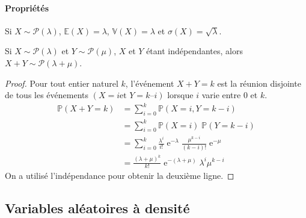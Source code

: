 \paragraph[Propriétés]{Propriétés}
\begin{theorem}
Si \(𝑋∼𝒫(𝜆)\), \(𝔼(𝑋)=𝜆\), \(𝕍(𝑋)=𝜆\) et \(σ(𝑋)=\sqrt{𝜆}\).
\end{theorem}
\begin{theorem}
Si \(𝑋∼𝒫(𝜆)\) et \(𝑌∼𝒫(𝜇)\), \(𝑋\) et \(𝑌\) étant indépendantes, alors
\(𝑋+𝑌∼𝒫(𝜆+𝜇)\).
\end{theorem}
\begin{proof}
Pour tout entier naturel \(𝑘\), l'événement \(𝑋+𝑌=𝑘\) est la réunion disjointe de tous les événements \((𝑋=𝑖\text{
et }𝑌=𝑘–𝑖)\) lorsque \(𝑖\) varie entre \(0\) et \(𝑘\).
\begin{align*}
ℙ(𝑋+𝑌=𝑘)&{}=∑_{𝑖=0}^{𝑘}ℙ(𝑋=𝑖,𝑌=𝑘-𝑖)
\\&{}=
∑_{𝑖=0}^{𝑘}ℙ(𝑋=𝑖)\;ℙ(𝑌=𝑘-𝑖)
\\&{}=
∑_{𝑖=0}^{𝑘}\frac{λ^{𝑖}}{𝑖!}\operatorname{e}^{-λ}\frac{μ^{𝑘-𝑖}}{(𝑘-𝑖)!}\operatorname{e}^{-μ}
\\&{}=
\frac{(λ+μ)^{𝑘}}{𝑘!}\operatorname{e}^{-(λ+μ)}λ^{𝑖}μ^{𝑘-𝑖}
\end{align*}
On a utilisé l'indépendance pour obtenir la deuxième ligne.
\end{proof}
%
\subsection{Variables aléatoires à densité}
